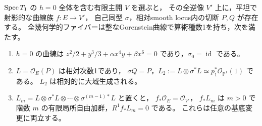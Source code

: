 \begin{lemma}\label{lem:degree-one-integral-curve}
$\operatorname{Spec} T_1$ の $h=0$ 全体を含む有限主開 $V$ を選ぶと，
その全逆像 $V'$ 上に，平坦で射影的な曲線族 $f:E\to V'$，
自己同型 $\sigma$，相対smooth locus内の切断 $P,Q$ が存在する。
全幾何学的ファイバーは整なGorenstein曲線で算術種数1を持ち，次を満たす。
\begin{enumerate}
 \item $h=0$ の曲線は
 $z^2/2+y^3/3+\alpha x^4y+\beta x^6=0$ であり，$\sigma_0=\operatorname{id}$ である。
 \item $L=\mathcal O_E(P)$ は相対次数1であり，
 $\sigma Q=P$，$L_2:=L\otimes\sigma^*L\simeq p_1^*\mathcal O_{\mathbb P^1}(1)$ である。
 $L_2$ は相対的に大域生成される。
 \item $L_m=L\otimes\sigma^*L\otimes\cdots\otimes\sigma^{(m-1)*}L$ と置くと，
 $f_*\mathcal O_E=\mathcal O_{V'}$，
 $f_*L_m$ は $m>0$ で階数 $m$ の有限局所自由加群，$R^1f_*L_m=0$ である。
 これらは任意の基底変更に両立する。
\end{enumerate}
\end{lemma}

